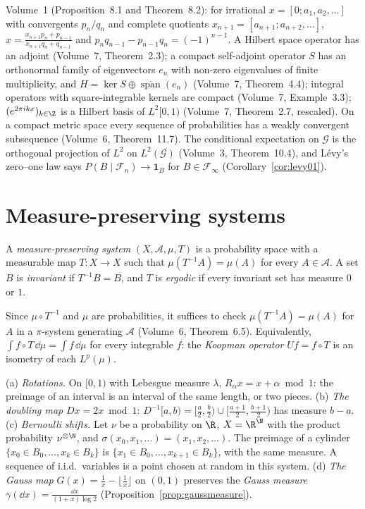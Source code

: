 \begin{reminder}
Volume~1 (Proposition~8.1 and Theorem~8.2): for irrational $x=[0;a_1,a_2,\dots]$ with convergents $p_n/q_n$ and complete quotients $x_{n+1}=[a_{n+1};a_{n+2},\dots]$,
$x=\frac{x_{n+1}p_n+p_{n-1}}{x_{n+1}q_n+q_{n-1}}$ and $p_nq_{n-1}-p_{n-1}q_n=(-1)^{n-1}$. A Hilbert space operator has an adjoint (Volume~7, Theorem~2.3); a compact self-adjoint operator $S$ has an orthonormal family of eigenvectors $e_n$ with non-zero eigenvalues of finite multiplicity, and $H=\ker S\oplus\overline{\operatorname{span}}(e_n)$ (Volume~7, Theorem~4.4);
integral operators with square-integrable kernels are compact (Volume~7, Example~3.3); $(e^{2\pi ikx})_{k\in\Z}$ is a Hilbert basis of $L^2[0,1)$ (Volume~7, Theorem~2.7, rescaled).
On a compact metric space every sequence of probabilities has a weakly convergent subsequence (Volume~6, Theorem~11.7). The conditional expectation on $\mathcal G$ is the orthogonal projection of $L^2$ on $L^2(\mathcal G)$ (Volume~3, Theorem~10.4),
and L\'evy's zero--one law says $P(B\mid\mathcal F_n)\to\mathbf 1_B$ for $B\in\mathcal F_\infty$ (Corollary~\ref{cor:levy01}).
\end{reminder}

\section{Measure-preserving systems}

\begin{definition}
A \emph{measure-preserving system} $(X,\mathcal A,\mu,T)$ is a probability space with a measurable map $T:X\to X$ such that $\mu(T^{-1}A)=\mu(A)$ for every $A\in\mathcal A$. A set $B$ is \emph{invariant} if
$T^{-1}B=B$, and $T$ is \emph{ergodic} if every invariant set has measure $0$ or $1$.
\end{definition}

Since $\mu\circ T^{-1}$ and $\mu$ are probabilities, it suffices to check $\mu(T^{-1}A)=\mu(A)$ for $A$ in a $\pi$-system generating $\mathcal A$ (Volume~6, Theorem~6.5). Equivalently, $\int f\circ T\,\dd\mu=\int f\,\dd\mu$ for every integrable $f$:
the \emph{Koopman operator} $Uf=f\circ T$ is an isometry of each $L^p(\mu)$.

\begin{example}\label{ex:mps}
(a) \emph{Rotations.} On $[0,1)$ with Lebesgue measure $\lambda$, $R_\alpha x=x+\alpha\bmod1$: the preimage of an interval is an interval of the same length, or two pieces.
(b) \emph{The doubling map} $Dx=2x\bmod1$: $D^{-1}[a,b)=[\frac a2,\frac b2)\cup[\frac{a+1}2,\frac{b+1}2)$ has measure $b-a$.
(c) \emph{Bernoulli shifts.} Let $\nu$ be a probability on $\R$, $X=\R^\N$ with the product probability $\nu^{\otimes\N}$, and $\sigma(x_0,x_1,\dots)=(x_1,x_2,\dots)$. The preimage of a cylinder $\{x_0\in B_0,\dots,x_k\in B_k\}$ is
$\{x_1\in B_0,\dots,x_{k+1}\in B_k\}$, with the same measure. A sequence of i.i.d.\ variables is a point chosen at random in this system.
(d) \emph{The Gauss map} $G(x)=\frac1x-\lfloor\frac1x\rfloor$ on $(0,1)$ preserves the \emph{Gauss measure} $\gamma(\dd x)=\frac{\dd x}{(1+x)\log2}$ (Proposition~\ref{prop:gaussmeasure}).
\end{example}


